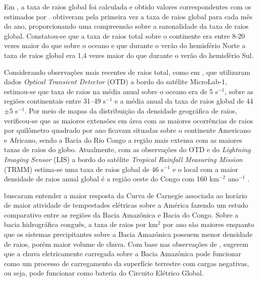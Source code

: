 Em , a taxa de raios global foi calculada e obtido valores correspondentes com os estimados por .   obtiveram pela primeira vez a taxa de raios global para cada mês do ano, proporcionando uma compreensão sobre a sazonalidade da taxa de raios global. Constatou-se que a taxa de raios total sobre o continente era entre 8-20 vezes maior do que sobre o oceano e que durante o verão do hemisfério Norte a taxa de raios global era 1,4 vezes maior do que durante o verão do hemisfério Sul.


Considerando observações mais recentes de raios total, como em \cite{christian2003global}, que utilizaram dados \textit{Optical Transient Detector} (OTD) a bordo do satélite MicroLab-1,  estimou-se que taxa de raios na média anual sobre o oceano era de 5 s$^{-1}$, sobre as regiões continentais entre 31--49 s$^{-1}$ e a  média anual da taxa de raios global de 44$\pm$5 s$^{-1}$. Por meio de mapas da distribuição da densidade geográfica de raios, verificou-se que as maiores extensões em área com as maiores ocorrências de raios por quilômetro quadrado por ano ficavam situadas sobre o continente Americano e Africano, sendo a Bacia do Rio Congo a região mais extensa com as maiores taxas de raios do globo. Atualmente, com as observações do OTD e do \textit{Lightning Imaging Sensor} (LIS) a bordo do satélite \textit{Tropical Rainfall Measuring Mission} (TRMM) estima-se uma taxa de raios global de 46 s$^{-1}$ e o local com a maior densidade de raios anual global é a região oeste do Congo com 160   km$^{-2}$ ano$^{-1}$ \cite{cecil2014gridded}.

 buscaram entender a maior resposta da Curva de Carnegie associada ao horário de maior atividade de tempestades elétricas sobre a América fazendo um estudo comparativo entre as regiões da Bacia Amazônica e Bacia do Congo. Sobre a bacia hidrográfica conguês, a taxa de raios por km$^2$ por ano são maiores enquanto que os sistemas precipitantes sobre a Bacia Amazônica possuem menor densidade de raios, porém maior volume de chuva. Com base nas observações de ,  sugerem que a chuva eletricamente carregada sobre a Bacia Amazônica pode funcionar como um processo de carregamento da superfície terrestre com cargas negativas, ou seja, pode funcionar como bateria do Circuito Elétrico Global.

